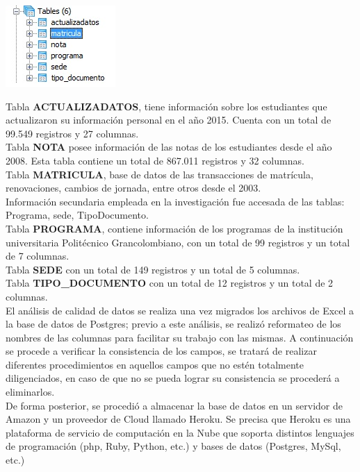 \documentclass[fleqn,10pt]{SelfArx} %
\begin{document}
\includegraphics[scale=1]{img/tablas.jpg}  

Tabla {\bf ACTUALIZADATOS}, tiene información sobre los estudiantes que actualizaron su información personal en el año 2015. Cuenta con un total de 99.549 registros y 27 columnas. \\
Tabla {\bf NOTA} posee información de las notas de los estudiantes desde el año 2008. Esta tabla contiene un total de 867.011 registros y 32 columnas. \\
Tabla {\bf MATRICULA}, base de datos de las transacciones de matrícula, renovaciones, cambios de jornada, entre otros desde el 2003. \\
Información secundaria empleada en la investigación fue accesada de las tablas: Programa, sede, TipoDocumento.\\
Tabla {\bf PROGRAMA}, contiene información de los programas de la institución universitaria Politécnico Grancolombiano, con un total de 99 registros y un total de 7 columnas. \\
Tabla {\bf SEDE} con un total de 149 registros y un total de 5 columnas. \\
Tabla {\bf TIPO\_DOCUMENTO } con un total de 12 registros y un total de 2 columnas. \\

El análisis de calidad de datos se realiza una vez migrados los archivos de Excel a la base de datos de Postgres; previo a este análisis, se realizó reformateo de los nombres de las columnas para facilitar su trabajo con las mismas. A continuación se procede a verificar la consistencia de los campos, se tratará de realizar diferentes procedimientos en aquellos campos que no estén totalmente diligenciados, en caso de que no se pueda lograr su consistencia se procederá a eliminarlos. \\

De forma posterior, se procedió a almacenar la base de datos en un servidor de Amazon y un proveedor de Cloud llamado Heroku. Se precisa que Heroku es una plataforma de servicio de computación en la Nube que soporta distintos lenguajes de programación (php, Ruby, Python, etc.) y bases de datos (Postgres, MySql, etc.)\\
\end{document}
